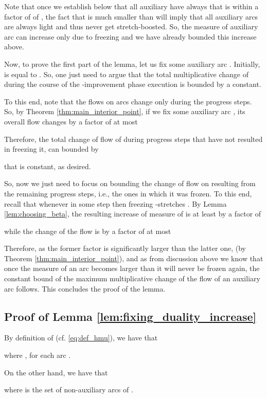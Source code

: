 \documentclass[11pt, letterpaper]{article}
\begin{document}
Note that once we establish below that all auxiliary have always  that is within a factor of  of , the fact that  is much smaller than  will imply that all auxiliary arcs are always light and thus never get stretch-boosted. So, the measure of auxiliary arc can increase only due to freezing and we have already bounded this increase above.

Now, to prove the first part of the lemma, let us fix some auxiliary arc . Initially,  is equal to . So, one just need to argue that the total multiplicative change of  during the course of the -improvement phase execution is bounded by a constant. 

To this end, note that the flows on arcs change only during the progress steps. So, by Theorem \ref{thm:main_interior_point}, if we fix some auxiliary arc , its overall flow changes by a factor of at most


Therefore, the total change of flow of  during progress steps that have not resulted in freezing it, can bounded by

that is constant, as desired. 

So, now we just need to focus on bounding the change of flow on  resulting from the remaining progress steps, i.e., the ones in which it was frozen. To this end, recall that whenever  in some step  then freezing -stretches . By Lemma \ref{lem:choosing_beta}, the resulting increase of measure of  is at least by a factor of 
 
while the change of the flow is by a factor of at most


Therefore, as the former factor is significantly larger than the latter one,  (by Theorem \ref{thm:main_interior_point}), and as from discussion above we know that once the measure of an arc becomes larger than  it will never be frozen again, the constant bound of the maximum multiplicative change of the flow of an auxiliary arc follows. This concludes the proof of the lemma.

\subsection{Proof of Lemma \ref{lem:fixing_duality_increase}}\label{app:fixing_duality_increase}


By definition of  (cf. \eqref{eq:def_hmu}), we have that

where , for each arc .

On the other hand, we have that

where  is the set of non-auxiliary arcs of . 
\end{document}
